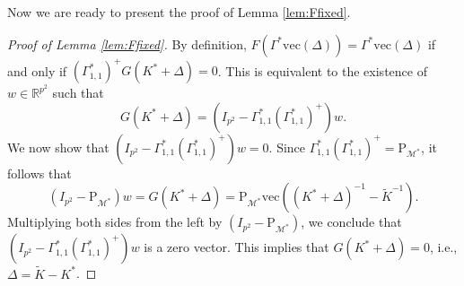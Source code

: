 \documentclass[12pt]{amsart}
\numberwithin{equation}{section}
\numberwithin{equation}{section}
\theoremstyle{definition}
\newcommand{\R}{\mathbb{R}}
\newcommand{\PM}{\mathrm{P}_{\mathcal{M}^\ast}}
\renewcommand{\v}[1]{\mathrm{vec}(#1)}
\begin{document}
Now we are ready to present the proof of Lemma \ref{lem:Ffixed}. 
\begin{proof}[Proof of Lemma \ref{lem:Ffixed}]
	By definition, $F(\Gamma^\ast\v{\Delta})=\Gamma^\ast\v{\Delta}$ if and only if
	$(\Gamma^\ast_{1,1})^+ G(K^\ast+\Delta)=0$. This is equivalent to the existence of $w\in\R^{p^2}$ such that 
	$$G(K^\ast+\Delta)=(I_{p^2} - \Gamma^\ast_{1,1}(\Gamma^\ast_{1,1})^+)w.$$
	We now show that $(I_{p^2} - \Gamma^\ast_{1,1}(\Gamma^\ast_{1,1})^+)w = 0$.
	Since $\Gamma_{1,1}^\ast(\Gamma_{1,1}^\ast)^{+}=\PM$, it follows that
	$$
	(I_{p^2} - \PM)w = G(K^\ast+\Delta) = \PM\v{(K^\ast+\Delta)^{-1}-\tilde{K}^{-1}}.
	$$
	Multiplying both sides from the left by $(I_{p^2} -\PM)$, 
	we conclude that $(I_{p^2} - \Gamma^\ast_{1,1}(\Gamma^\ast_{1,1})^+)w$ is a zero vector.
	This implies that $G(K^\ast+\Delta)=0$, i.e., $\Delta = \tilde{K}-K^\ast$. 
\end{proof}
\end{document}

